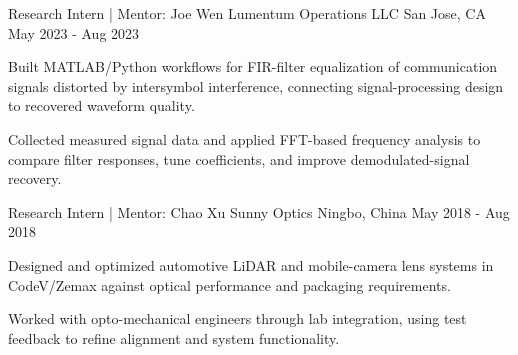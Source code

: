 
\begin{cventries}

  \cventry
    {Research Intern | Mentor: Joe Wen}
    {Lumentum Operations LLC}
    {San Jose, CA}
    {May 2023 - Aug 2023}
    {
      \begin{cvitems}
        \item {Built MATLAB/Python workflows for FIR-filter equalization of communication signals distorted by intersymbol interference, connecting signal-processing design to recovered waveform quality.}
        \item {Collected measured signal data and applied FFT-based frequency analysis to compare filter responses, tune coefficients, and improve demodulated-signal recovery.}
      \end{cvitems}
    }

  \cventry
    {Research Intern | Mentor: Chao Xu}
    {Sunny Optics}
    {Ningbo, China}
    {May 2018 - Aug 2018}
    {
      \begin{cvitems}
        \item {Designed and optimized automotive LiDAR and mobile-camera lens systems in CodeV/Zemax against optical performance and packaging requirements.}
        \item {Worked with opto-mechanical engineers through lab integration, using test feedback to refine alignment and system functionality.}
      \end{cvitems}
    }

\end{cventries}
